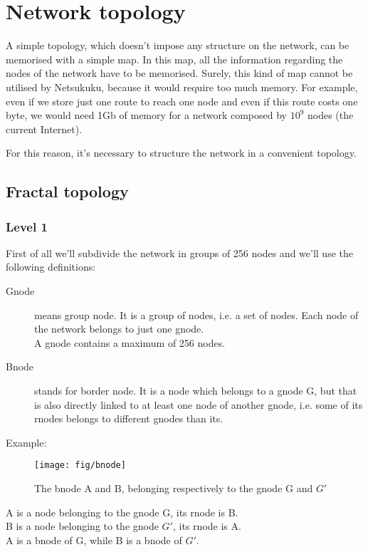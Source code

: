 \documentclass[a4paper]{article}
\begin{document}
\section{Network topology}
\label{sec:net_topology}

A simple topology, which doesn't impose any structure on the network, can be
memorised with a simple map. In this map, all the information regarding the
nodes of the network have to be memorised. Surely, this kind of map cannot be
utilised by Netsukuku, because it would require too much memory.
For example, even if we store just one route to reach one node and even if
this route costs one byte, we would need 1Gb of memory for a network composed
by $10^9$ nodes (the current Internet).

For this reason, it's necessary to structure the network in a convenient
topology.

\subsection{Fractal topology}
\label{sec:fractal_topology}
\subsubsection{Level 1}
First of all we'll subdivide the network in groups of 256 nodes and we'll use
the following definitions:
\begin{description}
	\item[Gnode] means group node. It is a group of nodes, i.e. a set of
		nodes. Each node of the network belongs to just one gnode.\\
		A gnode contains a maximum of 256 nodes.
	\item[Bnode] stands for border node. It is a node which belongs to a
		gnode G, but that is also directly linked to at least one node
		of another gnode, i.e. some of its rnodes belongs to different
		gnodes than its.
\end{description}

Example:\\
\begin{figure}[h]
	\begin{center}
		\texttt{[image: fig/bnode]}
	\end{center}
	\caption{The bnode A and B, belonging respectively to the gnode G and
	$G'$}
\end{figure}
A is a node belonging to the gnode G, its rnode is B.\\
B is a node belonging to the gnode $G'$, its rnode is A.\\
A is a bnode of G, while B is a bnode of $G'$.
\end{document}
